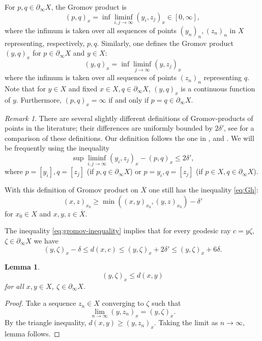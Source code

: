 \documentclass[12pt]{amsbook}%
\newtheorem{lem}[thm]{Lemma}
\theoremstyle{definition}
\theoremstyle{remark}
\newtheorem{rem}[thm]{Remark}
\numberwithin{section}{chapter}
\numberwithin{subsection}{section}
\numberwithin{figure}{chapter}
\def\geo{\partial_\infty}
\def\ol{\overline}
\begin{document}
  
\medskip 
For $p,q\in \geo X$, the Gromov product is  
\[
(p,q)_x=\inf \liminf_{i,j\to\infty}(y_i,z_j)_x\in [0,\infty],  
\]
where  the infimum is taken over all sequences of points $(y_n)_n, (z_n)_n$ in $X$ 
representing, respectively,  $p, q$. Similarly, one defines 
the Gromov product $(y,q)_x$ for $p\in \geo X$ and $y\in X$:
{\[(y,q)_x=\inf \liminf_{j\to\infty}(y,z_j)_x\]}
where  the infimum is taken over all sequences of points $(z_n)_n$ representing $q$. Note that for $y\in X$ and fixed $x\in X, q\in \geo X$, $(y,q)_x$ is 
a continuous function of $y$. Furthermore, $(p,q)_x=\infty$ if and only if $p=q\in \geo X$. 
 

\begin{rem}
There are several slightly different definitions of Gromov-prod\-ucts of points in the literature; their differences are uniformly bounded by $2\delta'$, 
see \cite{Vaisala} for a comparison of these definitions. Our definition follows the one in \cite{CDP}, \cite{Kapovich-Sardar} and \cite{Vaisala}. 
We will be frequently using the inequality
$$
\sup \liminf_{i,j\to\infty}(y_i,z_j)_x - (p,q)_{x} \leqslant 2\delta', 
$$
where $p=[y_i], q=[z_j]$ (if $p, q\in \geo X$) or $p=y_i, q=[z_j]$ (if $p\in X, q\in \geo X$). 
\end{rem}

With this definition of Gromov product on $\ol{X}$ one still has the inequality \eqref{eq:Gh}:
\begin{equation}
\label{eq:Gh1}
(x,z)_{x_0}\geqslant \min \left( (x,y)_{x_0}, (y,z)_{x_0}\right) - \delta'
\end{equation}
for $x_0\in X$ and $x, y, z\in \ol{X}$. 

The inequality \eqref{eq:gromov-inequality} implies that for every geodesic ray $c=y\zeta$, $\zeta\in \geo X$ we have 
\begin{equation}\label{eq:gromov-inequality1} 
(y,\zeta)_x - \delta \leqslant d(x, c)\leqslant (y,\zeta)_x+2\delta'\leqslant (y,\zeta)_x+6\delta. 
\end{equation} 



\begin{lem}\label{lem:0}
$$
(y,\zeta)_x\leqslant d(x,y)
$$
for all $x, y\in X$, $\zeta\in \geo X$. 
\end{lem}
\begin{proof} Take a sequence $z_n\in X$ converging to $\zeta$ such that 
$$
\lim_{n\to\infty} (y,z_n)_x= (y,\zeta)_x.
$$ 
By the triangle inequality, $d(x,y)\geqslant (y,z_n)_x$. Taking the limit as $n\to \infty$, lemma follows. 
\end{proof}
\end{document}
